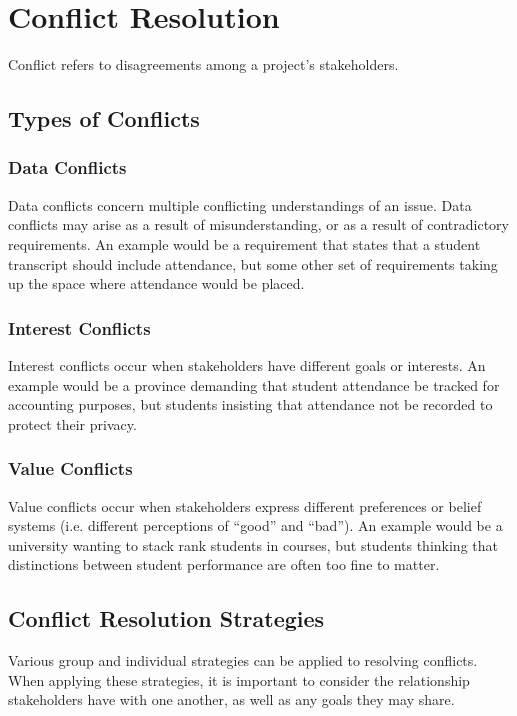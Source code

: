 \documentclass[12pt,titlepage]{article}
\let\stdsection\section
\renewcommand\section{\clearpage\stdsection}
\begin{document}
  \section{Conflict Resolution}
    Conflict refers to disagreements among a project's stakeholders.

    \subsection{Types of Conflicts}

      \subsubsection{Data Conflicts}
        Data conflicts concern multiple conflicting understandings of an issue. Data conflicts may arise as a result of misunderstanding, or
        as a result of contradictory requirements. An example would be a requirement that states that a student transcript should
        include attendance, but some other set of requirements taking up the space where attendance would be placed.

      \subsubsection{Interest Conflicts}
        Interest conflicts occur when stakeholders have different goals or interests. An example would be a province demanding that student
        attendance be tracked for accounting purposes, but students insisting that attendance not be recorded to protect their privacy.

      \subsubsection{Value Conflicts}
        Value conflicts occur when stakeholders express different preferences or belief systems (i.e. different perceptions of ``good'' and ``bad'').
        An example would be a university wanting to stack rank students in courses, but students thinking that distinctions between student
        performance are often too fine to matter.

    \subsection{Conflict Resolution Strategies}
      Various group and individual strategies can be applied to resolving conflicts. When applying these strategies, it is important to consider
      the relationship stakeholders have with one another, as well as any goals they may share.
\end{document}
